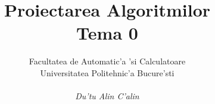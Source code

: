\documentclass[12pt,twoside]{report}
\begin{document}
\title{\LARGE{\textbf{Proiectarea Algoritmilor} \\Tema 0\\}}
\author{Facultatea de Automatic'a 'si Calculatoare\\Universitatea Politehnic'a Bucure'sti\\\\ {\em Du'tu Alin C'alin}}
\maketitle
\newpage
\tableofcontents
\newpage


\vspace{5 mm}
\nocite{*}


\end{document}
